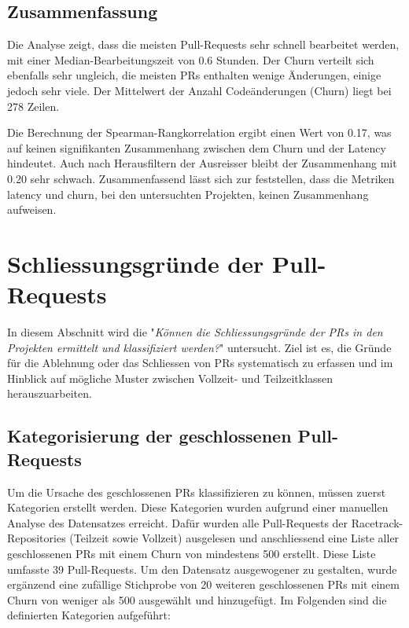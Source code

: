 \subsection{Zusammenfassung}
Die Analyse zeigt, dass die meisten Pull-Requests sehr schnell bearbeitet werden, mit einer Median-Bearbeitungszeit von 0.6 Stunden. Der Churn verteilt sich ebenfalls sehr ungleich, die meisten PRs enthalten wenige Änderungen, einige jedoch sehr viele. Der Mittelwert der Anzahl Codeänderungen (Churn) liegt bei 278 Zeilen.

Die Berechnung der Spearman-Rangkorrelation ergibt einen Wert von 0.17, was auf keinen signifikanten Zusammenhang zwischen dem Churn und der Latency hindeutet. Auch nach Herausfiltern der Ausreisser bleibt der Zusammenhang mit 0.20 sehr schwach.
Zusammenfassend lässt sich zur  feststellen, dass die Metriken latency und churn, bei den untersuchten Projekten, keinen Zusammenhang aufweisen.

\section{Schliessungsgründe der Pull-Requests}
\label{sec:UntersuchungSchliessgründePRs} 
In diesem Abschnitt wird die  "\textit{Können die Schliessungsgründe der PRs in den Projekten ermittelt und klassifiziert werden?}" untersucht. Ziel ist es, die Gründe für die Ablehnung oder das Schliessen von PRs systematisch zu erfassen und im Hinblick auf  mögliche Muster zwischen Vollzeit- und Teilzeitklassen herauszuarbeiten.

\subsection{Kategorisierung der geschlossenen Pull-Requests}
\label{sec:KategorienGeschlossenePRs} 
Um die Ursache des geschlossenen PRs klassifizieren zu können, müssen zuerst Kategorien erstellt werden. Diese Kategorien wurden aufgrund einer manuellen Analyse des Datensatzes erreicht. 
Dafür wurden alle Pull-Requests der Racetrack-Repositories (Teilzeit sowie Vollzeit) ausgelesen und anschliessend eine Liste aller geschlossenen PRs mit einem Churn von mindestens 500 erstellt. Diese Liste umfasste 39 Pull-Requests. Um den Datensatz ausgewogener zu gestalten, wurde ergänzend eine zufällige Stichprobe von 20 weiteren geschlossenen PRs mit einem Churn von weniger als 500 ausgewählt und hinzugefügt. Im Folgenden sind die definierten Kategorien aufgeführt:

